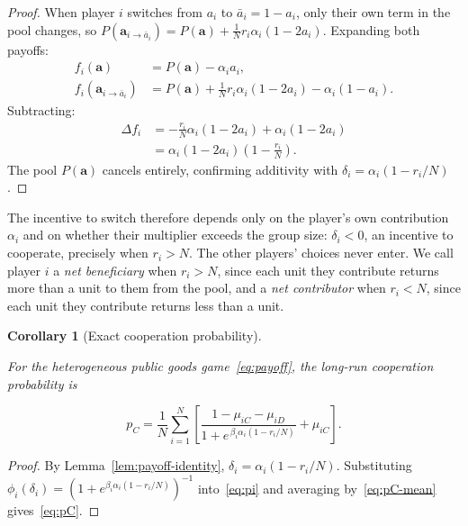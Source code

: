 \documentclass[11pt]{article}
\newtheorem{corollary}{Corollary}
\newcommand{\bfa}{\mathbf{a}}
\newcommand{\pC}{p_C}
\begin{document}
\begin{proof}
When player \(i\) switches from \(a_i\) to \(\bar{a}_i=1-a_i\), only their own term in
the pool changes, so
\(P(\bfa_{i\to\bar{a}_i}) = P(\bfa)+\tfrac{1}{N}r_i\alpha_i(1-2a_i)\).
Expanding both payoffs:
\begin{align*}
  f_i(\bfa) &= P(\bfa)-\alpha_i a_i, \\
  f_i(\bfa_{i\to\bar{a}_i})
  &= P(\bfa)+\tfrac{1}{N}r_i\alpha_i(1-2a_i)-\alpha_i(1-a_i).
\end{align*}
Subtracting:
\begin{align*}
  \Delta f_i
  &= -\frac{r_i}{N}\alpha_i(1-2a_i) + \alpha_i(1-2a_i) \\
  &= \alpha_i(1-2a_i)\!\left(1-\frac{r_i}{N}\right).
\end{align*}
The pool \(P(\bfa)\) cancels entirely, confirming additivity with
\(\delta_i=\alpha_i(1-r_i/N)\).
\end{proof}

The incentive to switch therefore depends only on the player's own contribution
\(\alpha_i\) and on whether their multiplier exceeds the group size: \(\delta_i<0\),
an incentive to cooperate, precisely when \(r_i>N\). The other players' choices never
enter. We call player \(i\) a \emph{net beneficiary} when \(r_i>N\), since each
unit they contribute returns more than a unit to them from the pool, and a
\emph{net contributor} when \(r_i<N\), since each unit they contribute returns
less than a unit.

\begin{corollary}[Exact cooperation probability]\label{cor:exact-pC}

For the heterogeneous public goods game~\eqref{eq:payoff}, the long-run cooperation
probability is

\begin{equation}\label{eq:pC}
  \boxed{
  \pC = \frac{1}{N}\sum_{i=1}^{N}
        \left[\frac{1-\mu_{iC}-\mu_{iD}}{1+e^{\,\beta_i\alpha_i(1-r_i/N)}}
          +\mu_{iC}\right]
  }.
\end{equation}

\end{corollary}

\begin{proof}

By Lemma~\ref{lem:payoff-identity}, \(\delta_i=\alpha_i(1-r_i/N)\). Substituting
\(\phi_i(\delta_i)=(1+e^{\beta_i\alpha_i(1-r_i/N)})^{-1}\) into~\eqref{eq:pi} and
averaging by~\eqref{eq:pC-mean} gives~\eqref{eq:pC}.

\end{proof}
\end{document}
